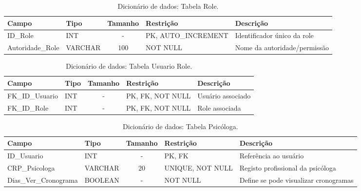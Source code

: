 \begin{table}[H]
    \centering
    \ABNTEXfontereduzida
    \caption[Dicionário de Dados - Tabela Role]{Dicionário de dados: Tabela Role.}
    \label{tab-tb-role}
    \begin{tabular}{p{3.5cm}|p{2cm}|c|p{3.5cm}|p{4cm}}
    \textbf{Campo} & \textbf{Tipo} & \textbf{Tamanho} & \textbf{Restrição} & \textbf{Descrição} \\
    \hline
    ID\_Role & INT & - & PK, AUTO\_INCREMENT & Identificador único da role \\
    \hline
    Autoridade\_Role & VARCHAR & 100 & NOT NULL & Nome da autoridade/permissão \\
    \end{tabular}
\end{table}

\begin{table}[H]
    \centering
    \ABNTEXfontereduzida
    \caption[Dicionário de Dados - Tabela Usuario Role]{Dicionário de dados: Tabela Usuario Role.}
    \label{tab-tb-usuario-role}
    \begin{tabular}{p{3.5cm}|p{2cm}|c|p{3.5cm}|p{4cm}}
    \textbf{Campo} & \textbf{Tipo} & \textbf{Tamanho} & \textbf{Restrição} & \textbf{Descrição} \\
    \hline
    FK\_ID\_Usuario & INT & - & PK, FK, NOT NULL & Usuário associado \\
    \hline
    FK\_ID\_Role & INT & - & PK, FK, NOT NULL & Role associada \\
    \end{tabular}
\end{table}

\begin{table}[H]
    \centering
    \ABNTEXfontereduzida
    \caption[Dicionário de Dados - Tabela Psicóloga]{Dicionário de dados: Tabela Psicóloga.}
    \label{tab-tb-psicologa}
    \begin{tabular}{p{3.5cm}|p{2cm}|c|p{3.5cm}|p{4cm}}
    \textbf{Campo} & \textbf{Tipo} & \textbf{Tamanho} & \textbf{Restrição} & \textbf{Descrição} \\
    \hline
    ID\_Usuario & INT & - & PK, FK & Referência ao usuário \\
    \hline
    CRP\_Psicologa & VARCHAR & 20 & UNIQUE, NOT NULL & Registo profissional da psicóloga \\
    \hline
    Dias\_Ver\_Cronograma & BOOLEAN & - & NOT NULL & Define se pode visualizar cronogramas \\
    \end{tabular}
\end{table}

